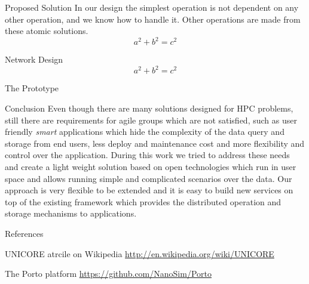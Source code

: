 \documentclass[final,hyperref={pdfpagelabels=true}]{beamer}
\begin{document}
\begin{frame}
\begin{columns}[t]
\begin{column}{.45\textwidth}
\begin{block}{Proposed Solution}
      In our design the simplest operation is not dependent on any other operation, and we know how to handle it. Other operations are made from these atomic solutions.
        \begin{equation}
          a^2+b^2=c^2
        \end{equation}
      \end{block}

      \begin{block}{Network Design}
        \begin{equation}
          a^2+b^2=c^2
        \end{equation}
      \end{block}

      \begin{block}{The Prototype}
      \end{block}
	  \begin{block}{Conclusion}
	  Even though there are many solutions designed for HPC problems, still there are requirements for agile groups which are not satisfied, such as user friendly \textit{smart} applications which hide the complexity
	  of the data query and storage from end users, less deploy and maintenance cost and more flexibility and control over the application.
	  During this work we tried to address these needs and create a light weight
	  solution based on open technologies which run in user space and allows running simple and complicated scenarios over the data. Our approach is very flexible to be extended and it is easy to build new services on top
	  of the existing framework which provides the distributed operation and storage mechanisms to applications.
	  \end{block}
      \begin{block}{References}
        \begin{thebibliography}{999}
        UNICORE atrcile on Wikipedia
        \url{http://en.wikipedia.org/wiki/UNICORE}
        
        The Porto platform
        \url{https://github.com/NanoSim/Porto}
%          
          

\end{thebibliography}
\end{block}
\end{column}
\end{columns}
\end{frame}
\end{document}
